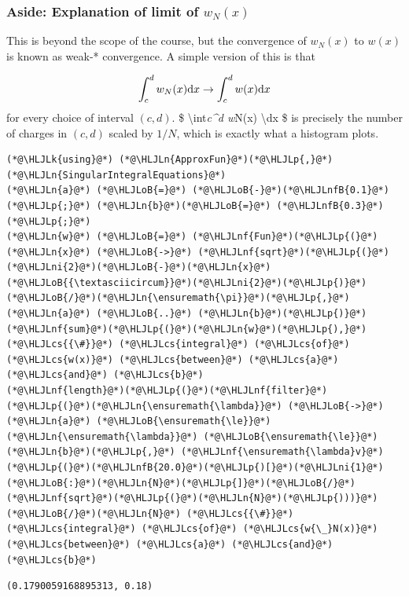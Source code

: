 \documentclass[12pt,a4paper]{article}
\newcommand{\HLJLk}[1]{\textcolor[RGB]{148,91,176}{\textbf{#1}}}
\newcommand{\HLJLn}[1]{#1}
\newcommand{\HLJLnf}[1]{\textcolor[RGB]{66,102,213}{#1}}
\newcommand{\HLJLnfB}[1]{\textcolor[RGB]{59,151,46}{#1}}
\newcommand{\HLJLni}[1]{\textcolor[RGB]{59,151,46}{#1}}
\newcommand{\HLJLoB}[1]{\textcolor[RGB]{102,102,102}{\textbf{#1}}}
\newcommand{\HLJLp}[1]{#1}
\newcommand{\HLJLcs}[1]{\textcolor[RGB]{153,153,119}{\textit{#1}}}
\def\D{ {\rm d} }
\def\dx{\D x}
\begin{document}
\subsubsection{Aside: Explanation of limit of $w_N(x)$}
This is beyond the scope of the course, but the convergence of $w_N(x)$ to $w(x)$ is known as weak-* convergence.  A simple version of this is that

\[
   \int_c^d w_N(x) \dx \rightarrow \int_c^d w(x) \dx
\]
for every choice of interval $(c,d)$. \$   {\textbackslash}int\emph{c\^{}d w}N(x) {\textbackslash}dx \$ is precisely the number of charges in  $(c,d)$ scaled by $1/N$,  which is exactly what a histogram plots.


\begin{lstlisting}
(*@\HLJLk{using}@*) (*@\HLJLn{ApproxFun}@*)(*@\HLJLp{,}@*) (*@\HLJLn{SingularIntegralEquations}@*)
(*@\HLJLn{a}@*) (*@\HLJLoB{=}@*) (*@\HLJLoB{-}@*)(*@\HLJLnfB{0.1}@*)(*@\HLJLp{;}@*) (*@\HLJLn{b}@*)(*@\HLJLoB{=}@*) (*@\HLJLnfB{0.3}@*)(*@\HLJLp{;}@*)
(*@\HLJLn{w}@*) (*@\HLJLoB{=}@*) (*@\HLJLnf{Fun}@*)(*@\HLJLp{(}@*)(*@\HLJLn{x}@*) (*@\HLJLoB{->}@*) (*@\HLJLnf{sqrt}@*)(*@\HLJLp{(}@*)(*@\HLJLni{2}@*)(*@\HLJLoB{-}@*)(*@\HLJLn{x}@*)(*@\HLJLoB{{\textasciicircum}}@*)(*@\HLJLni{2}@*)(*@\HLJLp{)}@*)(*@\HLJLoB{/}@*)(*@\HLJLn{\ensuremath{\pi}}@*)(*@\HLJLp{,}@*) (*@\HLJLn{a}@*) (*@\HLJLoB{..}@*) (*@\HLJLn{b}@*)(*@\HLJLp{)}@*)
(*@\HLJLnf{sum}@*)(*@\HLJLp{(}@*)(*@\HLJLn{w}@*)(*@\HLJLp{),}@*)  (*@\HLJLcs{{\#}}@*) (*@\HLJLcs{integral}@*) (*@\HLJLcs{of}@*) (*@\HLJLcs{w(x)}@*) (*@\HLJLcs{between}@*) (*@\HLJLcs{a}@*) (*@\HLJLcs{and}@*) (*@\HLJLcs{b}@*)
(*@\HLJLnf{length}@*)(*@\HLJLp{(}@*)(*@\HLJLnf{filter}@*)(*@\HLJLp{(}@*)(*@\HLJLn{\ensuremath{\lambda}}@*) (*@\HLJLoB{->}@*) (*@\HLJLn{a}@*) (*@\HLJLoB{\ensuremath{\le}}@*) (*@\HLJLn{\ensuremath{\lambda}}@*) (*@\HLJLoB{\ensuremath{\le}}@*) (*@\HLJLn{b}@*)(*@\HLJLp{,}@*) (*@\HLJLnf{\ensuremath{\lambda}v}@*)(*@\HLJLp{(}@*)(*@\HLJLnfB{20.0}@*)(*@\HLJLp{)[}@*)(*@\HLJLni{1}@*)(*@\HLJLoB{:}@*)(*@\HLJLn{N}@*)(*@\HLJLp{]}@*)(*@\HLJLoB{/}@*)(*@\HLJLnf{sqrt}@*)(*@\HLJLp{(}@*)(*@\HLJLn{N}@*)(*@\HLJLp{)))}@*)(*@\HLJLoB{/}@*)(*@\HLJLn{N}@*) (*@\HLJLcs{{\#}}@*) (*@\HLJLcs{integral}@*) (*@\HLJLcs{of}@*) (*@\HLJLcs{w{\_}N(x)}@*) (*@\HLJLcs{between}@*) (*@\HLJLcs{a}@*) (*@\HLJLcs{and}@*) (*@\HLJLcs{b}@*)
\end{lstlisting}

\begin{lstlisting}
(0.1790059168895313, 0.18)
\end{lstlisting}
\end{document}

